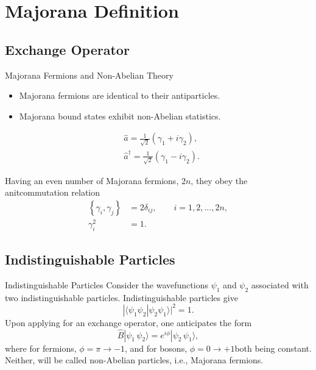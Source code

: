 \documentclass{loyola-beamer}
\begin{document}
\section{Majorana Definition}
\subsection{Exchange Operator}

\begin{frame}{Majorana Fermions and Non-Abelian Theory}
	\begin{itemize}
		\item Majorana fermions are identical to their antiparticles.
		\item Majorana bound states exhibit non-Abelian statistics.
	\end{itemize}
	$$
		\begin{aligned}
			 & \hat{a}=\frac{1}{\sqrt{2}}\left(\gamma_1+i \gamma_2\right),            \\
			 & \hat{a}^{\dagger}=\frac{1}{\sqrt{2}}\left(\gamma_1-i \gamma_2\right) .
			\label{eq:ferm as mf}
		\end{aligned}
	$$

	Having an even number of Majorana fermions, $ 2n $, they obey the anitcommutation relation
	\begin{equation}
		\begin{aligned}
			\left\{\gamma_i, \gamma_j\right\} & = 2 \delta_{i j}, \qquad i=1, 2, \dots, 2n  , \\
			\gamma_i^2                        & = 1.
		\end{aligned}
	\end{equation}
\end{frame}

\subsection{Indistinguishable Particles}

\begin{frame}{Indistinguishable Particles}
	Consider the wavefunctions $ \psi_1 $ and $ \psi_2 $ associated with two indistinguishable particles. Indistinguishable particles give
	\[
		| \langle \psi_1 \psi_2 | \psi_2 \psi_1 \rangle |^2 = 1 .
	\]
	Upon applying for an exchange operator, one anticipates the form
	\begin{equation}
		\hat{B} | \psi_1\, \psi_2 \rangle = e^{i\phi} | \psi_2\, \psi_1 \rangle,
	\end{equation}
	where for fermions, $ \phi = \pi \rightarrow -1 $, and for bosons, $ \phi = 0 \rightarrow +1 $\textendash both being constant.
	Neither, will be called non-Abelian particles, i.e., Majorana fermions.
\end{frame}
\end{document}
